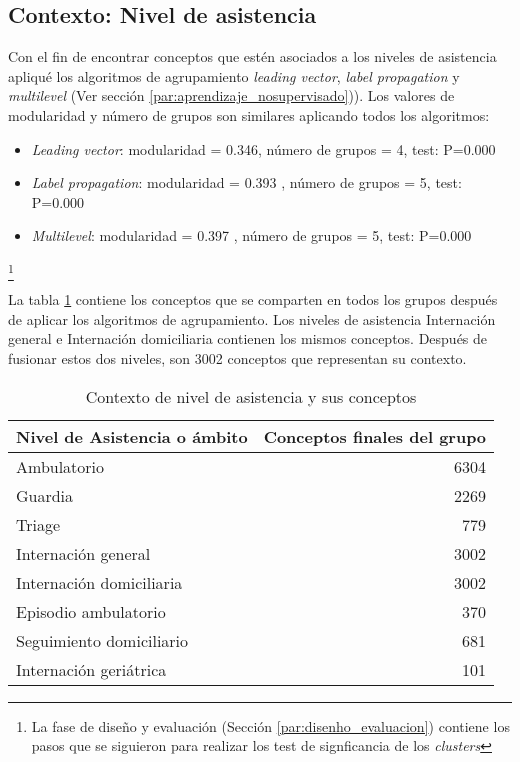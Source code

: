\subsection{Contexto: Nivel de asistencia}
Con el fin de encontrar conceptos que estén asociados a los niveles de asistencia apliqué los algoritmos de agrupamiento \textit{leading vector}, \textit{label propagation} y \textit{multilevel} (Ver sección \ref{par:aprendizaje_nosupervisado})). Los valores de modularidad y número de grupos son similares aplicando todos los algoritmos:
\begin{itemize}
\item \textit{Leading vector}: modularidad = \num{0.346}, número de grupos = 4, test: P=0.000
\item \textit{Label propagation}: modularidad = \num{0.393} , número de grupos = 5, test: P=0.000
\item \textit{Multilevel}: modularidad = \num{0.397} , número de grupos = 5, test: P=0.000
\end{itemize}
\footnote{La fase de diseño y evaluación (Sección \ref{par:disenho_evaluacion}) contiene los pasos que se siguieron para realizar los test de signficancia de los \textit{clusters}}

La tabla \ref{nivel_asistencia_clus} contiene los conceptos que se comparten en todos los grupos después de aplicar los algoritmos de agrupamiento. Los niveles de asistencia Internación general e Internación domiciliaria contienen los mismos conceptos. Después de fusionar estos dos niveles, son 3002 conceptos que representan su contexto.

\begin{table}[htb]
\centering
\caption{Contexto de nivel de asistencia y sus conceptos }
\label{nivel_asistencia_clus}
\begin{tabular}{@{}lr@{}}
\toprule
Nivel de Asistencia o ámbito & Conceptos finales del grupo \\ \midrule
Ambulatorio & \num{6304} \\
Guardia & \num{2269} \\
Triage & \num{779} \\
Internación general & \num{3002} \\
Internación domiciliaria  & \num{3002}\\
Episodio ambulatorio & \num{370} \\
Seguimiento domiciliario & \num{681}\\
Internación geriátrica & \num{101} \\ \bottomrule
\end{tabular}
\end{table}


